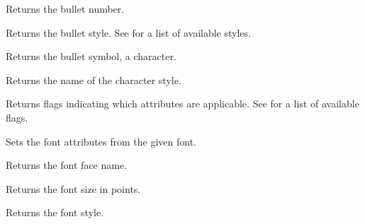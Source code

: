 
Returns the bullet number.

\label{wxrichtextattrgetbulletstyle}


Returns the bullet style.
See  for a list of available styles.

\label{wxrichtextattrgetbulletsymbol}


Returns the bullet symbol, a character.

\label{wxrichtextattrgetcharacterstylename}


Returns the name of the character style.

\label{wxrichtextattrgetflags}


Returns flags indicating which attributes are applicable.
See  for a list of available flags.

\label{wxrichtextattrgetfontattributes}


Sets the font attributes from the given font.

\label{wxrichtextattrgetfontfacename}


Returns the font face name.

\label{wxrichtextattrgetfontsize}


Returns the font size in points.

\label{wxrichtextattrgetfontstyle}


Returns the font style.

